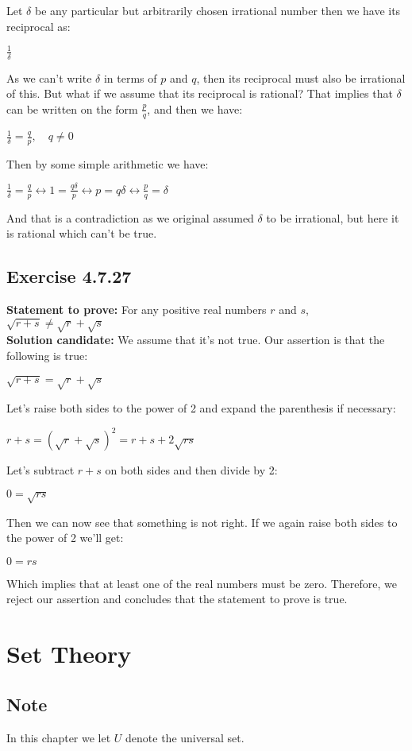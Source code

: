 \documentclass{report}
\newcommand{\cent}[1]{\begin{center}#1\end{center}}
\newcommand{\Prove}{\textbf{Statement to prove: }}
\newcommand{\Solution}{\textbf{Solution candidate: }}
\newcommand{\QED}{\boxed{}}
\newcommand{\Section}[1]{\section{#1}}
\newcommand{\Exercise}[1]{\subsection{Exercise #1}}
\begin{document}
	Let $\delta$ be any particular but arbitrarily chosen irrational number then we have its reciprocal as:
	
	\cent{$\frac{1}{\delta}$}
	
	As we can't write $\delta$ in terms of $p$ and $q$, then its reciprocal must also be irrational of this. But what if we assume that its reciprocal is rational? That implies that $\delta$ can be written on the form $\frac{p}{q}$, and then we have:
	
	\cent{$\frac{1}{\delta} = \frac{q}{p}, \quad q \neq 0$}
	
	Then by some simple arithmetic we have:
	
	\cent{$\frac{1}{\delta} = \frac{q}{p} \leftrightarrow 1=\frac{q\delta}{p} \leftrightarrow p = q \delta  \leftrightarrow \frac{p}{q} = \delta$}
	
	And that is a contradiction as we original assumed $\delta$ to be irrational, but here it is rational which can't be true.\\
	\QED
	
	\Exercise{4.7.27}
	
	\Prove
	For any positive real numbers $r$ and $s$, $\sqrt{r+s} \neq \sqrt{r} + \sqrt{s}$\\
	
	\Solution
	We assume that it's not true. Our assertion is that the following is true:
	
	\cent{$\sqrt{r+s} = \sqrt{r} + \sqrt{s}$}
	
	Let's raise both sides to the power of 2 and expand the parenthesis if necessary:
	
	\cent{$r + s = (\sqrt{r} + \sqrt{s})^{2} = r + s + 2 \sqrt{rs}$}
	
	Let's subtract $r+s$ on both sides and then divide by 2:
	
	\cent{$0 = \sqrt{rs}$}
	
	Then we can now see that something is not right. If we again raise both sides to the power of 2 we'll get:
	
	\cent{$0 = rs$}
	
	Which implies that at least one of the real numbers must be zero. Therefore, we reject our assertion and concludes that the statement to prove is true.\\
	\QED
	\Section{Set Theory}
	\subsection*{Note}
	In this chapter we let $U$ denote the universal set.
	
\end{document}
